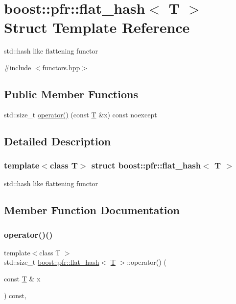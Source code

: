 \hypertarget{structboost_1_1pfr_1_1flat__hash}{}\section{boost\+:\+:pfr\+:\+:flat\+\_\+hash$<$ T $>$ Struct Template Reference}
\label{structboost_1_1pfr_1_1flat__hash}


std\+::hash like flattening functor  




{\ttfamily \#include $<$functors.\+hpp$>$}

\subsection*{Public Member Functions}
\begin{DoxyCompactItemize}
\item 
std\+::size\+\_\+t \mbox{\hyperlink{structboost_1_1pfr_1_1flat__hash_a4f934852c913e38a7690c80263d3794b}{operator()}} (const \mbox{\hyperlink{struct_t}{T}} \&x) const noexcept
\end{DoxyCompactItemize}


\subsection{Detailed Description}
\subsubsection*{template$<$class T$>$\newline
struct boost\+::pfr\+::flat\+\_\+hash$<$ T $>$}

std\+::hash like flattening functor 

\subsection{Member Function Documentation}
\mbox{\label{structboost_1_1pfr_1_1flat__hash_a4f934852c913e38a7690c80263d3794b}} 
\subsubsection{\texorpdfstring{operator()()}{operator()()}}
{\footnotesize\ttfamily template$<$class T $>$ \\
std\+::size\+\_\+t \mbox{\hyperlink{structboost_1_1pfr_1_1flat__hash}{boost\+::pfr\+::flat\+\_\+hash}}$<$ \mbox{\hyperlink{struct_t}{T}} $>$\+::operator() (\begin{DoxyParamCaption}\item[{const \mbox{\hyperlink{struct_t}{T}} \&}]{x }\end{DoxyParamCaption}) const\hspace{0.3cm}{\ttfamily [inline]}, {\ttfamily [noexcept]}}

